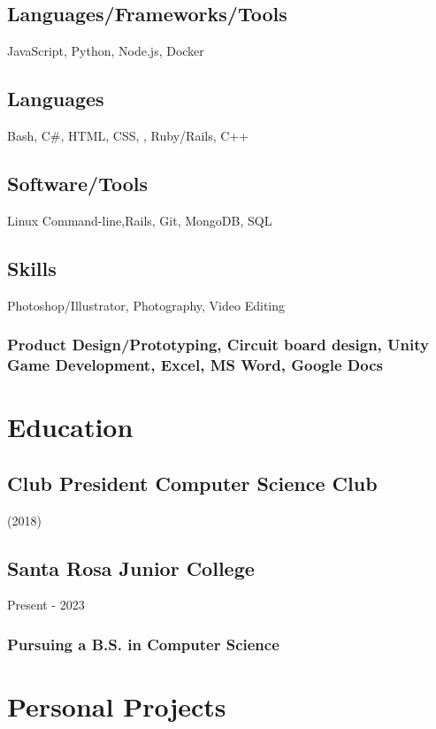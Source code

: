 \documentclass{article}
\begin{document}
		\subsection{Languages/Frameworks/Tools}
		JavaScript, Python, Node.js, Docker
		\subsection{Languages}
		Bash,  C\#, HTML, CSS, , Ruby/Rails, C++
		\vspace{-2mm}
		
		\subsection{Software/Tools}
		Linux Command-line,Rails, Git, MongoDB, SQL
		\vspace{-3mm}
		\subsection{Skills}Photoshop/Illustrator, Photography, Video Editing
		\vspace{-3mm}
		\subsubsection{Product Design/Prototyping, Circuit board design,  Unity Game Development, Excel, MS Word, Google Docs}
		\vspace{-3mm}
    		
    		    		
	\section{Education}
        \subsection{Club President  Computer Science Club}  (2018)
        \vspace{-2mm}   
         
        \subsection{Santa Rosa Junior College} Present - 2023 
        \vspace{-2mm}
            \subsubsection{Pursuing a B.S. in Computer Science}
\section{Personal Projects}
\end{document}
